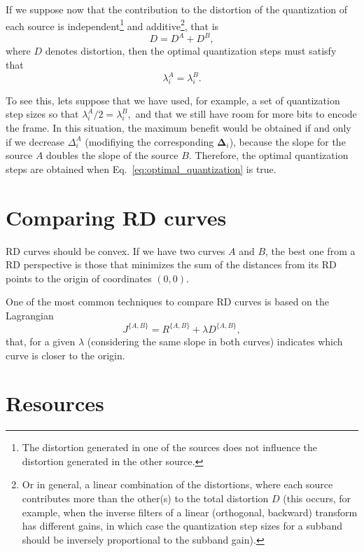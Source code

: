 If we suppose now that the contribution to the distortion of the
quantization of each source is independent\footnote{The distortion
generated in one of the sources does not influence the distortion
generated in the other source.} and additive\footnote{Or in general, a
linear combination of the distortions, where each source contributes
more than the other(s) to the total distortion $D$ (this occurs, for
example, when the inverse filters of a linear (orthogonal, backward)
transform has different gains, in which case the quantization step
sizes for a subband should be inversely proportional to the subband
gain).}, that is
\begin{equation}
  D = D^A + D^B,
  \label{eq:additive}
\end{equation}
where $D$ denotes distortion, then the optimal quantization steps must
satisfy that~\cite{vetterli1995wavelets,sayood2017introduction}
\begin{equation}
  \lambda^A_i = \lambda^B_i.
  \label{eq:optimal_quantization}
\end{equation}

To see this, lets suppose that we have used, for example, a set of
quantization step sizes so that $\lambda^A_i/2 = \lambda^B_i,$ and
that we still have room for more bits to encode the frame. In this
situation, the maximum benefit would be obtained if and only if we
decrease $\Delta^A_i$ (modifiying the corresponding
$\mathbf{\Delta}_i$), because the slope for the source $A$ doubles
the slope of the source $B$. Therefore, the optimal quantization
steps are obtained when Eq.~\ref{eq:optimal_quantization} is
true.

\section{Comparing RD curves}
RD curves should be convex. If we have two curves $A$ and $B$, the
best one from a RD perspective is those that minimizes the sum of the
distances from its RD points to the origin of coordinates $(0,0)$.

One of the most common techniques to compare RD curves is based on the
Lagrangian~\cite{vetterli1995wavelets,sayood2017introduction}
\begin{equation}
  J^{\{A,B\}}=R^{\{A,B\}}+\lambda D^{\{A,B\}},
  \label{eq:lagrangian}
\end{equation}
that, for a given $\lambda$ (considering the same slope in both
curves) indicates which curve is closer to the origin.

\section{Resources}
\renewcommand{\addcontentsline}[3]{}%

